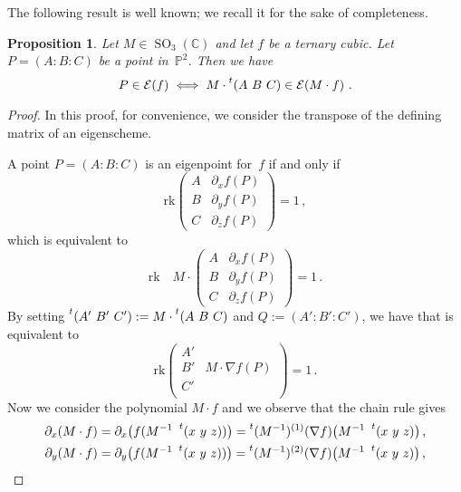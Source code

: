 \documentclass{amsart}
\theoremstyle{plain}
\newtheorem{prop}[lemma]{Proposition}
\theoremstyle{definition}
\newcommand{\C}{\mathbb{C}}
\newcommand{\p}{\mathbb{P}}
\newcommand{\de}{\partial}
\newcommand{\SO}{\operatorname{SO}}
\newcommand{\Eig}[1]{\mathcal{E}\!\left( {#1} \right)}
\newcommand{\rk}{\ensuremath{\mathrm{rk}}}
\begin{document}
The following result is well known; we recall it for the sake of completeness.

\begin{prop}
Let $M \in \SO_3(\C)$ and let $f$ be a ternary cubic.
Let $P = (A: B: C)$ be a point in~$\p^2$.
Then we have
%
\[
  P \in \Eig{f} \iff M \cdot \prescript{t} {}(A \ B \ C) \in \Eig{M \cdot f} \,.
\]
%
\end{prop}
\begin{proof}
In this proof,
for convenience, we consider the transpose of the defining matrix of an eigenscheme.

A point $P = (A: B: C)$ is an eigenpoint for~$f$ if and only if
%
\begin{equation*}
  \mathrm{rk}
  \begin{pmatrix}
    A & \de_x f(P) \\
    B & \de_y f(P) \\
    C & \de_z f(P)
  \end{pmatrix}
  = 1 \,,
\end{equation*}
%
which is equivalent to
%
\begin{equation}
\label{eq:def_matrix_M}
  \mathrm{rk} \quad M \cdot 
  \begin{pmatrix}
    A & \de_x f(P) \\
    B & \de_y f(P) \\
    C & \de_z f(P)
  \end{pmatrix}
  = 1 \,.
\end{equation}
%
By setting $\prescript{t} {}(A' \ B' \ C' ) := M \cdot \prescript{t} {}(A \ B \ C) $ and $Q := (A':B':C')$, we have that 
is equivalent to
%
\begin{equation}
\label{eq:transformed}
  \rk
  \begin{pmatrix}
    A' & \\
    B' & M \cdot \nabla f (P) \\
    C' & \\
  \end{pmatrix}
  = 1 \,.
\end{equation}
%
Now we consider the polynomial $M \cdot f$ and we observe that the chain rule gives
%
\begin{gather*}
  \partial_x (M\cdot f) = \partial_x \bigl( f(M^{-1} \ \prescript{t} {} (x \ y \ z)) \bigr) = \prescript{t} {}(M^{-1})^{(1)}(\nabla f) \bigl( M^{-1}\ \prescript{t} {} (x \ y \ z) \bigr) \,, \\
  \partial_y (M\cdot f) = \partial_y \bigl( f(M^{-1} \ \prescript{t} {} (x \ y \ z)) \bigr) = \prescript{t} {}(M^{-1})^{(2)}(\nabla f) \bigl( M^{-1}\ \prescript{t} {} (x \ y \ z) \bigr) \,, \\

\end{gather*}
\end{proof}
\end{document}
